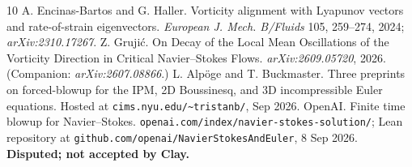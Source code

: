 \documentclass[11pt]{article}
\begin{document}
\begin{thebibliography}{10}
 A. Encinas-Bartos and G. Haller. Vorticity alignment with Lyapunov vectors and rate-of-strain eigenvectors. \emph{European J. Mech. B/Fluids} 105, 259--274, 2024; \emph{arXiv:2310.17267}.
 Z. Grujić. On Decay of the Local Mean Oscillations of the Vorticity Direction in Critical Navier--Stokes Flows. \emph{arXiv:2609.05720}, 2026. (Companion: \emph{arXiv:2607.08866}.)
 L. Alpöge and T. Buckmaster. Three preprints on forced-blowup for the IPM, 2D Boussinesq, and 3D incompressible Euler equations. Hosted at \texttt{cims.nyu.edu/\textasciitilde tristanb/}, Sep 2026.
 OpenAI. Finite time blowup for Navier--Stokes. \texttt{openai.com/index/navier-stokes-solution/}; Lean repository at \texttt{github.com/openai/NavierStokesAndEuler}, 8 Sep 2026. \textbf{Disputed; not accepted by Clay.}
\end{thebibliography}
\end{document}
